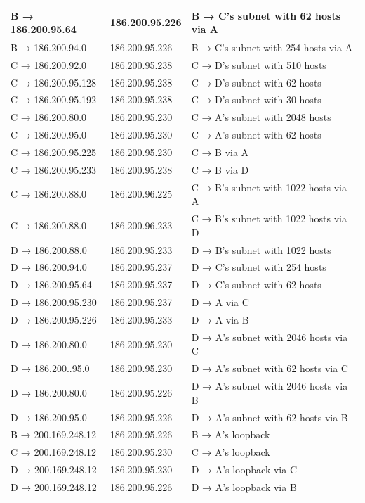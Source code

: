 \documentclass[a4paper, titlepage,12pt]{article}
\begin{document}
\begin{longtable}{|l|l|l|}
			\hline
			B → 186.200.95.64 & 186.200.95.226 & B →  C’s subnet with 62 hosts via A \\
			\hline
			B → 186.200.94.0 & 186.200.95.226 & B →  C’s subnet with 254 hosts via A \\
			\hline
			C → 186.200.92.0 & 186.200.95.238 & C →  D’s subnet with 510 hosts \\
			\hline
			C → 186.200.95.128 & 186.200.95.238 & C →  D’s subnet with 62 hosts \\
			\hline
			C → 186.200.95.192 & 186.200.95.238 & C →  D’s subnet with 30 hosts \\
			\hline
			C → 186.200.80.0 & 186.200.95.230 & C →  A’s subnet with 2048 hosts \\
			\hline
			C → 186.200.95.0 & 186.200.95.230 & C →  A’s subnet with 62 hosts \\
			\hline
			C → 186.200.95.225 & 186.200.95.230 & C →  B via A \\
			\hline
			C → 186.200.95.233 & 186.200.95.238 & C →  B via D \\
			\hline
			C → 186.200.88.0 & 186.200.96.225 & C →  B’s subnet with 1022 hosts via A \\
			\hline
			C → 186.200.88.0 & 186.200.96.233 & C →  B’s subnet with 1022 hosts via D \\
			\hline
			D → 186.200.88.0 & 186.200.95.233 & D →  B’s subnet with 1022 hosts \\
			\hline
			D → 186.200.94.0 & 186.200.95.237 & D →  C’s subnet with 254 hosts \\
			\hline
			D → 186.200.95.64 & 186.200.95.237 & D →  C’s subnet with 62 hosts \\
			\hline
			D → 186.200.95.230 & 186.200.95.237 & D →  A via C \\
			\hline
			D → 186.200.95.226 & 186.200.95.233 & D →  A via B \\
			\hline
			D → 186.200.80.0 & 186.200.95.230 & D →  A’s subnet with 2046 hosts via C \\
			\hline
			D → 186.200..95.0 & 186.200.95.230 & D →  A’s subnet with 62 hosts via C \\
			\hline
			D → 186.200.80.0 & 186.200.95.226 & D →  A’s subnet with 2046 hosts via B \\
			\hline
			D → 186.200.95.0 & 186.200.95.226 & D →  A’s subnet with 62 hosts via B \\
			\hline
			B → 200.169.248.12 & 186.200.95.226 & B →  A’s loopback  \\
			\hline
			C → 200.169.248.12 & 186.200.95.230 & C →  A’s loopback \\
			\hline
			D → 200.169.248.12 & 186.200.95.230 & D →  A’s loopback via C \\
			\hline
			D → 200.169.248.12 & 186.200.95.226 & D →  A’s loopback via B \\
			\hline
		\end{longtable}
\end{document}
